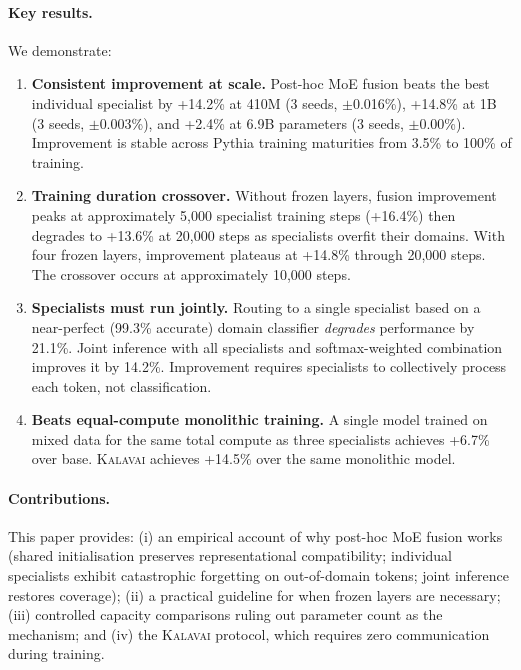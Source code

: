 \documentclass{article}
\newcommand{\kalavai}{\textsc{Kalavai}\xspace}
\begin{document}
\paragraph{Key results.} We demonstrate:
\begin{enumerate}[leftmargin=*, itemsep=2pt]
  \item \textbf{Consistent improvement at scale.} Post-hoc MoE fusion beats the best individual specialist by +14.2\% at 410M (3 seeds, $\pm$0.016\%), +14.8\% at 1B (3 seeds, $\pm$0.003\%), and +2.4\% at 6.9B parameters (3 seeds, $\pm$0.00\%). Improvement is stable across Pythia training maturities from 3.5\% to 100\% of training.
  \item \textbf{Training duration crossover.} Without frozen layers, fusion improvement peaks at approximately 5,000 specialist training steps (+16.4\%) then degrades to +13.6\% at 20,000 steps as specialists overfit their domains. With four frozen layers, improvement plateaus at +14.8\% through 20,000 steps. The crossover occurs at approximately 10,000 steps.
  \item \textbf{Specialists must run jointly.} Routing to a single specialist based on a near-perfect (99.3\% accurate) domain classifier \emph{degrades} performance by 21.1\%. Joint inference with all specialists and softmax-weighted combination improves it by 14.2\%. Improvement requires specialists to collectively process each token, not classification.
  \item \textbf{Beats equal-compute monolithic training.} A single model trained on mixed data for the same total compute as three specialists achieves +6.7\% over base. \kalavai achieves +14.5\% over the same monolithic model.
\end{enumerate}

\paragraph{Contributions.} This paper provides: (i) an empirical account of why post-hoc MoE fusion works (shared initialisation preserves representational compatibility; individual specialists exhibit catastrophic forgetting on out-of-domain tokens; joint inference restores coverage); (ii) a practical guideline for when frozen layers are necessary; (iii) controlled capacity comparisons ruling out parameter count as the mechanism; and (iv) the \kalavai protocol, which requires zero communication during training.

\end{document}
